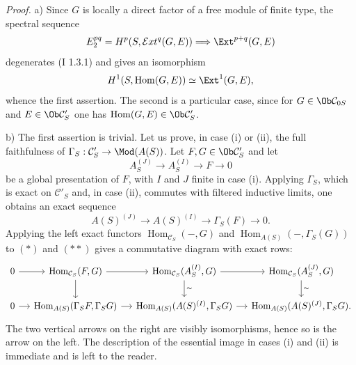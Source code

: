 \emph{Proof.} a) Since $G$ is locally a direct factor of a free module of finite type, the spectral sequence
\[
E_2^{pq}=H^p(S,\mathcal{E}xt^q(G,E))\Longrightarrow \Ext^{p+q}(G,E)
\]
degenerates (I 1.3.1) and gives an isomorphism
\[
H^1(S,\operatorname{Hom}(G,E))\simeq \Ext^1(G,E),
\]
whence the first assertion. The second is a particular case, since for $G\in\Ob\mathcal C_{0S}$ and $E\in\Ob\mathcal C'_S$ one has $\operatorname{Hom}(G,E)\in\Ob\mathcal C'_S$.

b) The first assertion is trivial. Let us prove, in case (i) or (ii), the full faithfulness of $\Gamma_S:\mathcal C'_S\to\Mod(A(S))$. Let $F,G\in\Ob\mathcal C'_S$ and let
\[
A_S^{(J)}\longrightarrow A_S^{(I)}\longrightarrow F\longrightarrow0
\tag{$*$}
\]
be a global presentation of $F$, with $I$ and $J$ finite in case (i). Applying $\Gamma_S$, which is exact on $\mathcal C'_S$ and, in case (ii), commutes with filtered inductive limits, one obtains an exact sequence
\[
A(S)^{(J)}\longrightarrow A(S)^{(I)}\longrightarrow\Gamma_S(F)\longrightarrow0.
\tag{$**$}
\]
Applying the left exact functors $\operatorname{Hom}_{\mathcal C_S}(-,G)$ and $\operatorname{Hom}_{A(S)}(-,\Gamma_S(G))$ to $(*)$ and $(**)$ gives a commutative diagram with exact rows:
\[
\begin{tikzcd}[column sep=small]
0 \arrow[r] & \operatorname{Hom}_{\mathcal C_S}(F,G) \arrow[r] \arrow[d] &
\operatorname{Hom}_{\mathcal C_S}(A_S^{(I)},G) \arrow[r] \arrow[d,"\sim"] &
\operatorname{Hom}_{\mathcal C_S}(A_S^{(J)},G) \arrow[d,"\sim"] \\
0 \arrow[r] & \operatorname{Hom}_{A(S)}(\Gamma_SF,\Gamma_SG) \arrow[r] &
\operatorname{Hom}_{A(S)}(A(S)^{(I)},\Gamma_SG) \arrow[r] &
\operatorname{Hom}_{A(S)}(A(S)^{(J)},\Gamma_SG).
\end{tikzcd}
\]
The two vertical arrows on the right are visibly isomorphisms, hence so is the arrow on the left. The description of the essential image in cases (i) and (ii) is immediate and is left to the reader.

